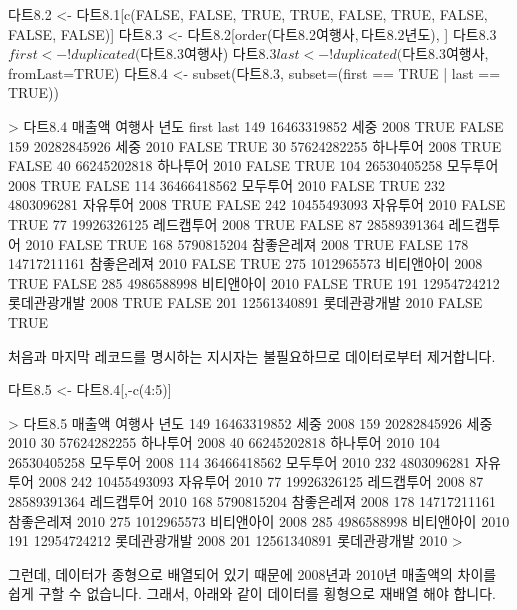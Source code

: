 \documentclass[tutorial.tex]{subfiles}
\begin{document}
\begin{Schunk}
\begin{Soutput}
다트8.2 <- 다트8.1[c(FALSE, FALSE, TRUE, TRUE, FALSE, TRUE, FALSE, FALSE, FALSE)]
다트8.3 <- 다트8.2[order(다트8.2$여행사, 다트8.2$년도), ]
다트8.3$first <- !duplicated(다트8.3$여행사)
다트8.3$last <- !duplicated(다트8.3$여행사, fromLast=TRUE)
다트8.4 <- subset(다트8.3, subset=(first == TRUE | last == TRUE))

> 다트8.4
         매출액       여행사 년도 first  last
149 16463319852         세중 2008  TRUE FALSE
159 20282845926         세중 2010 FALSE  TRUE
30  57624282255     하나투어 2008  TRUE FALSE
40  66245202818     하나투어 2010 FALSE  TRUE
104 26530405258     모두투어 2008  TRUE FALSE
114 36466418562     모두투어 2010 FALSE  TRUE
232  4803096281     자유투어 2008  TRUE FALSE
242 10455493093     자유투어 2010 FALSE  TRUE
77  19926326125   레드캡투어 2008  TRUE FALSE
87  28589391364   레드캡투어 2010 FALSE  TRUE
168  5790815204   참좋은레져 2008  TRUE FALSE
178 14717211161   참좋은레져 2010 FALSE  TRUE
275  1012965573   비티앤아이 2008  TRUE FALSE
285  4986588998   비티앤아이 2010 FALSE  TRUE
191 12954724212 롯데관광개발 2008  TRUE FALSE
201 12561340891 롯데관광개발 2010 FALSE  TRUE

\end{Soutput}
\end{Schunk}

처음과 마지막 레코드를 명시하는 지시자는 불필요하므로 데이터로부터 제거합니다.
 
\begin{Schunk}
\begin{Soutput}
다트8.5 <- 다트8.4[,-c(4:5)]

> 다트8.5
         매출액       여행사 년도
149 16463319852         세중 2008
159 20282845926         세중 2010
30  57624282255     하나투어 2008
40  66245202818     하나투어 2010
104 26530405258     모두투어 2008
114 36466418562     모두투어 2010
232  4803096281     자유투어 2008
242 10455493093     자유투어 2010
77  19926326125   레드캡투어 2008
87  28589391364   레드캡투어 2010
168  5790815204   참좋은레져 2008
178 14717211161   참좋은레져 2010
275  1012965573   비티앤아이 2008
285  4986588998   비티앤아이 2010
191 12954724212 롯데관광개발 2008
201 12561340891 롯데관광개발 2010
> 
\end{Soutput}
\end{Schunk}

그런데, 데이터가 종형으로 배열되어 있기 때문에 2008년과 2010년 매출액의 차이를 쉽게 구할 수 없습니다. 
그래서, 아래와 같이 데이터를 횡형으로 재배열 해야 합니다. 
\end{document}
